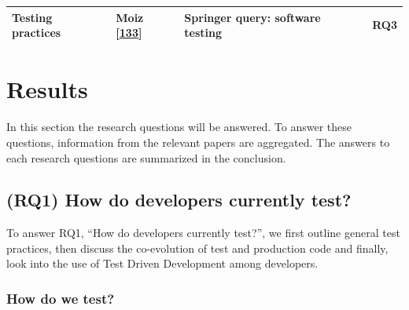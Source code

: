 \documentclass[]{book}
\begin{document}
\begin{longtable}[]{@{}llll@{}}
\begin{minipage}[t]{0.18\columnwidth}\raggedright\strut
Testing practices\strut
\end{minipage} & \begin{minipage}[t]{0.16\columnwidth}\raggedright\strut
Moiz {[}\protect\hyperlink{ref-moiz2017uncertainty}{133}{]}\strut
\end{minipage} & \begin{minipage}[t]{0.50\columnwidth}\raggedright\strut
Springer query: software testing\strut
\end{minipage} & \begin{minipage}[t]{0.04\columnwidth}\raggedright\strut
RQ3\strut
\end{minipage}\tabularnewline
\bottomrule
\end{longtable}

\section{Results}\label{results}

In this section the research questions will be answered. To answer these
questions, information from the relevant papers are aggregated. The
answers to each research questions are summarized in the conclusion.

\subsection{(RQ1) How do developers currently
test?}\label{rq1-how-do-developers-currently-test}

To answer RQ1, ``How do developers currently test?'', we first outline
general test practices, then discuss the co-evolution of test and
production code and finally, look into the use of Test Driven
Development among developers.

\subsubsection{How do we test?}\label{how-do-we-test}
\end{document}
